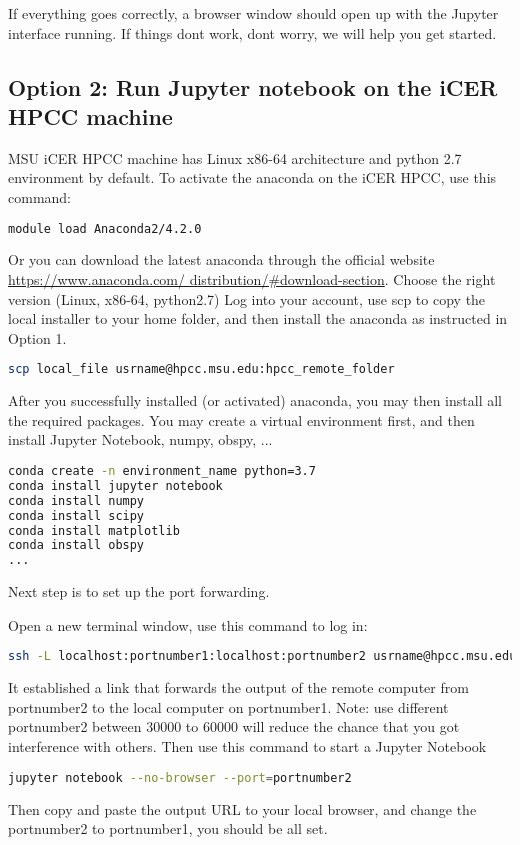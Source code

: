 \documentclass[12pt]{article}   	%
\begin{document}
If everything goes correctly, a browser window should open up with the Jupyter interface running. If things don\textquotesingle t work, don\textquotesingle t worry, we will help you get started.

\subsection*{Option 2: Run Jupyter notebook on the iCER HPCC machine}
MSU iCER HPCC machine has Linux x86-64 architecture and python 2.7 environment by default. To activate the anaconda on the iCER HPCC, use this command:
\begin{lstlisting}[language=bash,keywordstyle=\color{blue!70},basicstyle=\ttfamily]
module load Anaconda2/4.2.0
\end{lstlisting}
Or you can download the latest anaconda through the official website \href{https://www.anaconda.com/distribution/\#download-section}{https://www.anaconda.com/ distribution/\#download-section}. Choose the right version (Linux, x86-64, python2.7) Log into your account, use scp to copy the local installer to your home folder, and then install the anaconda as instructed in Option 1.
\begin{lstlisting}[language=bash, keywordstyle=\color{blue!70},basicstyle=\ttfamily]
scp local_file usrname@hpcc.msu.edu:hpcc_remote_folder
\end{lstlisting}
After you successfully installed (or activated) anaconda, you may then install all the required packages. You may create a virtual environment first, and then install Jupyter Notebook, numpy, obspy, ...
 \begin{lstlisting}[language=bash,keywordstyle=\color{blue!70},basicstyle=\ttfamily]
conda create -n environment_name python=3.7
conda install jupyter notebook
conda install numpy
conda install scipy
conda install matplotlib
conda install obspy
...
 \end{lstlisting}
Next step is to set up the port forwarding.

Open a new terminal window, use this command to log in:
\begin{lstlisting}[language=bash,keywordstyle=\color{blue!70},basicstyle=\ttfamily]
ssh -L localhost:portnumber1:localhost:portnumber2 usrname@hpcc.msu.edu
 \end{lstlisting}
It established a link that forwards the output of the remote computer from portnumber2 to the local computer on portnumber1. 
Note: use different portnumber2 between 30000 to 60000 will reduce the chance that you got interference with others. Then use this command to start a Jupyter Notebook
\begin{lstlisting}[language=bash, keywordstyle=\color{blue!70},basicstyle=\ttfamily]
jupyter notebook --no-browser --port=portnumber2
 \end{lstlisting}
Then copy and paste the output URL to your local browser, and change the portnumber2 to portnumber1, you should be all set.
\end{document}
